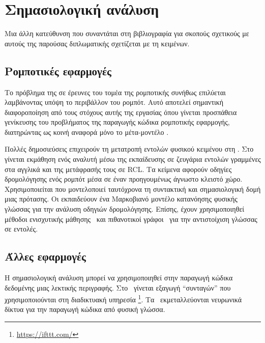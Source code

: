 \section{Σημασιολογική ανάλυση}
Μια άλλη κατεύθυνση που συναντάται στη βιβλιογραφία για σκοπούς σχετικούς με αυτούς της παρούσας διπλωματικής σχετίζεται με τη  κειμένων.

\subsection{Ρομποτικές εφαρμογές}
Το πρόβλημα της  σε έρευνες του τομέα της ρομποτικής συνήθως επιλύεται λαμβάνοντας υπόψη το περιβάλλον του ρομπότ.
Αυτό αποτελεί σημαντική διαφοροποίηση από τους στόχους αυτής της εργασίας όπου γίνεται προσπάθεια γενίκευσης του προβλήματος της παραγωγής κώδικα ρομποτικής εφαρμογής,
διατηρώντας ως κοινή αναφορά μόνο το μέτα-μοντέλο \metamodel{}.

Πολλές δημοσιεύσεις επιχειρούν τη μετατροπή εντολών φυσικού κειμένου στη .
Στο~\cite{matuszek2013learning} γίνεται εκμάθηση ενός αναλυτή μέσω της εκπαίδευσης σε ζευγάρια εντολών γραμμένες στα αγγλικά και της μετάφρασής τους σε RCL.
Τα κείμενα αφορούν οδηγίες δρομολόγησης ενός ρομπότ μέσα σε έναν προηγουμένως άγνωστο κλειστό χώρο.
Χρησιμοποιείται  που μοντελοποιεί ταυτόχρονα τη συντακτική και σημασιολογική δομή μιας πρότασης.
Οι \citet{shimizu2009learning} εκπαιδεύουν ένα Μαρκοβιανό μοντέλο κατανόησης φυσικής γλώσσας για την ανάλυση οδηγιών δρομολόγησης.
Επίσης, έχουν χρησιμοποιηθεί μέθοδοι ενισχυτικής μάθησης~\cite{branavan2009reinforcement}
και πιθανοτικοί γράφοι~\cite{tellex2011understanding,tellex2011approaching}
για την αντιστοίχιση γλώσσας σε εντολές.

\subsection{Άλλες εφαρμογές}
Η σημασιολογική ανάλυση μπορεί να χρησιμοποιηθεί στην παραγωγή κώδικα δεδομένης μιας λεκτικής περιγραφής.
Στο~\cite{quirk2015language} γίνεται εξαγωγή \enquote{συνταγών} που χρησιμοποιούνται στη διαδικτυακή υπηρεσία \footnote{\url{https://ifttt.com/}}.
Τα~\cite{yin2017syntactic,rabinovich2017abstract} εκμεταλλεύονται νευρωνικά δίκτυα για την παραγωγή κώδικα  από φυσική γλώσσα.

